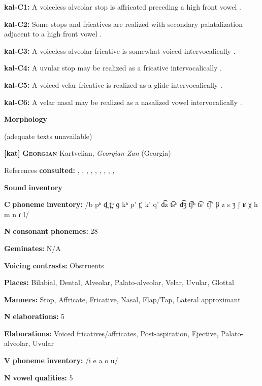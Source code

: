 \begin{styleBody}
\textbf{kal-C1:} A voiceless alveolar stop is affricated preceding a high front vowel \citep[333]{Fortescue1984}.

\textbf{kal-C2:} Some stops and fricatives are realized with secondary palatalization adjacent to a high front vowel \citep[333]{Fortescue1984}.

\textbf{kal-C3:} A voiceless alveolar fricative is somewhat voiced intervocalically \citep[334]{Fortescue1984}.

\textbf{kal-C4:} A uvular stop may be realized as a fricative intervocalically \citep[333]{Fortescue1984}.

\textbf{kal-C5:} A voiced velar fricative is realized as a glide intervocalically \citep[334]{Fortescue1984}.

\textbf{kal-C6:} A velar nasal may be realized as a nasalized vowel intervocalically \citep[334]{Fortescue1984}.

\textbf{Morphology}

(adequate texts unavailable)

\textbf{[kat]}   \textbf{\textsc{Georgian}}    Kartvelian, \textit{Georgian-Zan} (Georgia)

References \textbf{consulted:} \citet{Aronson1990}, \citet{Aronson1991}, \citet{Butskhrikidze2002}, \citet{Chitoran1998}, \citet{Hewitt1995}, \citet{JunEtAl2006}, \citet{ShostedChikovani2006}, \citet{SkopeteasFéry2010}, \citet{Vicenek2010}, \citet{Vogt1958}

\textbf{Sound} \textbf{inventory}

\textbf{C} \textbf{phoneme} \textbf{inventory:} /b pʰ d̪ t̪ʰ ɡ kʰ p’ t̪’ k’ q’ d͡z t͡sʰ d͡ʒ t͡ʃʰ t͡s’ t͡ʃ’ β z s ʒ ʃ ʁ χ h m n ɾ l/

\textbf{N} \textbf{consonant} \textbf{phonemes:} 28

\textbf{Geminates:} N/A

\textbf{Voicing} \textbf{contrasts:} Obstruents

\textbf{Places:} Bilabial, Dental, Alveolar, Palato-alveolar, Velar, Uvular, Glottal

\textbf{Manners:} Stop, Affricate, Fricative, Nasal, Flap/Tap, Lateral approximant

\textbf{N} \textbf{elaborations:} 5

\textbf{Elaborations:} Voiced fricatives/affricates, Post-aspiration, Ejective, Palato-alveolar, Uvular

\textbf{V} \textbf{phoneme} \textbf{inventory:} /i e a o u/

\textbf{N} \textbf{vowel} \textbf{qualities:} 5


\end{styleBody}
